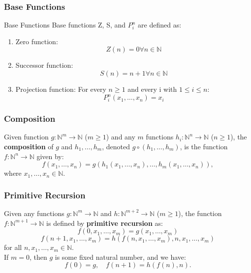 \documentclass{beamer}
\begin{document}
\begin{frame}
  \frametitle{Base Functions}
  \begin{block}{Base Functions}
    Base functions Z, S, and \(P_i^n\) are defined as:
    \begin{enumerate}
      \item Zero function:
        \[
          Z(n) = 0 \forall n \in \mathbb{N}
        \]
      \item Successor function:
        \[
          S(n) = n + 1 \forall n \in \mathbb{N}
        \]
      \item Projection function: For every \(n\geq1\) and every i with \(1\leq i \leq n\):
        \[
          P_i^n(x_1,\dots,x_n) = x_i
        \]
    \end{enumerate}
    
  \end{block}
\end{frame}

\begin{frame}
  \frametitle{Composition}
  \begin{definition}
    Given function \( g: \mathbb{N}^m \to \mathbb{N} \) (\( m \geq 1 \)) and any \( m \) functions \( h_i: \mathbb{N}^n \to \mathbb{N} \) (\( n \geq 1 \)), the \textbf{composition} of \( g \) and \( h_1, \dots, h_m \), denoted \( g \circ (h_1, \dots, h_m) \), is the function \( f: \mathbb{N}^n \to \mathbb{N} \) given by:
    \[
      f(x_1, \dots, x_n) = g(h_1(x_1, \dots, x_n), \dots, h_m(x_1, \dots, x_n)),
    \]
    where \( x_1, \dots, x_n \in \mathbb{N} \).
  \end{definition}
\end{frame}

\begin{frame}
  \frametitle{Primitive Recursion}

  \begin{definition}
    Given any functions \( g: \mathbb{N}^m \to \mathbb{N} \) and \( h: \mathbb{N}^{m+2} \to \mathbb{N} \) (\( m \geq 1 \)), the function \( f: \mathbb{N}^{m+1} \to \mathbb{N} \) is defined by \textbf{primitive recursion} as:
    \[
      f(0, x_1, \dots, x_m) = g(x_1, \dots, x_m)
    \]
    \[
      f(n+1, x_1, \dots, x_m) = h(f(n, x_1, \dots, x_m), n, x_1, \dots, x_m)
    \]
    for all \( n, x_1, \dots, x_m \in \mathbb{N} \). \\
    If \( m = 0 \), then \( g \) is some fixed natural number, and we have:
    \[
      f(0) = g, \quad f(n+1) = h(f(n), n).
    \]
  \end{definition}

\end{frame}
\end{document}
